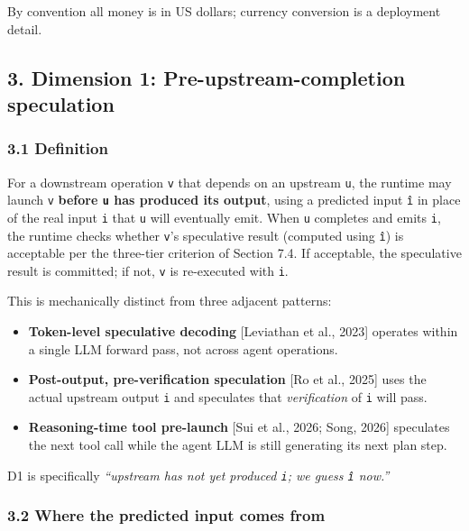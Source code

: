 \documentclass[
  11pt,
]{article}
\providecommand{\tightlist}{%
  \setlength{\itemsep}{0pt}\setlength{\parskip}{0pt}}
\begin{document}
By convention all money is in US dollars; currency conversion is a
deployment detail.

\subsection{3. Dimension 1: Pre-upstream-completion
speculation}\label{dimension-1-pre-upstream-completion-speculation}

\subsubsection{3.1 Definition}\label{definition}

For a downstream operation \texttt{v} that depends on an upstream
\texttt{u}, the runtime may launch \texttt{v} \textbf{before \texttt{u}
has produced its output}, using a predicted input \texttt{î} in place of
the real input \texttt{i} that \texttt{u} will eventually emit. When
\texttt{u} completes and emits \texttt{i}, the runtime checks whether
\texttt{v}'s speculative result (computed using \texttt{î}) is
acceptable per the three-tier criterion of Section 7.4. If acceptable,
the speculative result is committed; if not, \texttt{v} is re-executed
with \texttt{i}.

This is mechanically distinct from three adjacent patterns:

\begin{itemize}
\tightlist
\item
  \textbf{Token-level speculative decoding} {[}Leviathan et al., 2023{]}
  operates within a single LLM forward pass, not across agent
  operations.
\item
  \textbf{Post-output, pre-verification speculation} {[}Ro et al.,
  2025{]} uses the actual upstream output \texttt{i} and speculates that
  \emph{verification} of \texttt{i} will pass.
\item
  \textbf{Reasoning-time tool pre-launch} {[}Sui et al., 2026; Song,
  2026{]} speculates the next tool call while the agent LLM is still
  generating its next plan step.
\end{itemize}

D1 is specifically \emph{``upstream has not yet produced \texttt{i}; we
guess \texttt{î} now.''}

\subsubsection{3.2 Where the predicted input comes
from}\label{where-the-predicted-input-comes-from}
\end{document}
